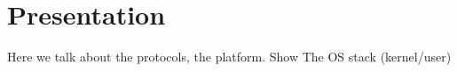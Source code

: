 \chapter{Presentation}
Here we talk about the protocols, the platform.
Show The OS stack (kernel/user)

